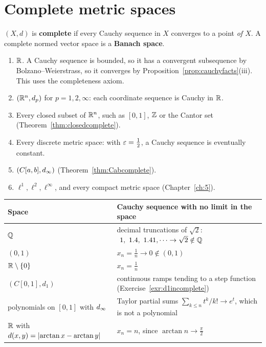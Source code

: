 \section{Complete metric spaces}
\begin{definition}\label{def:complete}
$(X,d)$ is \textbf{complete} if every Cauchy sequence in $X$ converges to a point \emph{of $X$}. A complete normed vector space is a \textbf{Banach space}.
\end{definition}

\begin{example}\label{ex:complete}
\leavevmode
\begin{enumerate}[label=(\alph*)]
  \item $\mathbb{R}$. A Cauchy sequence is bounded, so it has a convergent subsequence by Bolzano--Weierstrass, so it converges by Proposition~\ref{prop:cauchyfacts}(iii). This uses the completeness axiom.
  \item $(\mathbb{R}^n,d_p)$ for $p=1,2,\infty$: each coordinate sequence is Cauchy in $\mathbb{R}$.
  \item Every closed subset of $\mathbb{R}^n$, such as $[0,1]$, $\mathbb{Z}$ or the Cantor set (Theorem~\ref{thm:closedcomplete}).
  \item Every discrete metric space: with $\varepsilon=\frac12$, a Cauchy sequence is eventually constant.
  \item $(C[a,b],d_\infty)$ (Theorem~\ref{thm:Cabcomplete}).
  \item $\ell^1,\ell^2,\ell^\infty$, and every compact metric space (Chapter~\ref{ch:5}).
\end{enumerate}
\end{example}

\begin{example}
\leavevmode\par
\begin{center}
\renewcommand{\arraystretch}{1.25}
\begin{tabularx}{0.95\linewidth}{@{}lY@{}}
\toprule
Space & Cauchy sequence with no limit in the space\\
\midrule
$\mathbb{Q}$ & decimal truncations of $\sqrt2$: $\ 1,\ 1.4,\ 1.41,\dots\to\sqrt2\notin\Q$\\
$(0,1)$ & $x_n=\frac1n\to0\notin(0,1)$\\
$\mathbb{R}\setminus\{0\}$ & $x_n=\frac1n$\\
$(C[0,1],d_1)$ & continuous ramps tending to a step function (Exercise~\ref{exr:d1incomplete})\\
polynomials on $[0,1]$ with $d_\infty$ & Taylor partial sums $\sum_{k\le n}t^k/k!\to e^t$, which is not a polynomial\\
$\mathbb{R}$ with $d(x,y)=\left\lvert \arctan x-\arctan y\right\rvert$ & $x_n=n$, since $\arctan n\to\frac\pi2$\\
\bottomrule
\end{tabularx}
\end{center}
\end{example}

